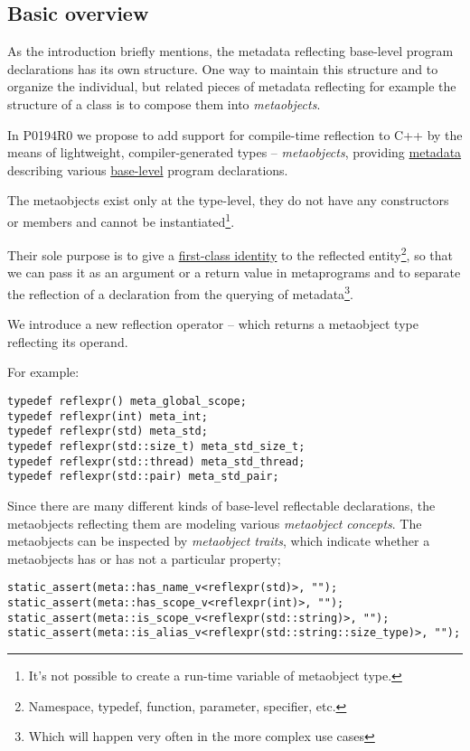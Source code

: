 \subsection{Basic overview}

As the introduction briefly mentions, the metadata reflecting base-level
program declarations has its own structure. One way to maintain this structure
and to organize the individual, but related pieces of metadata reflecting
for example the structure of a class is to compose them into {\em metaobjects}.

In P0194R0 we propose to add support for
compile-time reflection to C++ by the means of lightweight, compiler-generated
types -- {\em metaobjects}, providing \hyperref[term-metadata]{metadata}
describing various \hyperref[term-base-meta-level]{base-level} program declarations.

The metaobjects exist only at the type-level, they do not have any constructors
or members and cannot be instantiated\footnote{It's not possible to create
a run-time variable of metaobject type.}.

Their sole purpose is to give a \hyperref[term-first-class]{first-class identity}
to the reflected entity\footnote{Namespace, typedef, function, parameter, specifier, etc.},
so that we can pass it as an argument or a return value in metaprograms and to
separate the reflection of a declaration from the querying of metadata\footnote
{Which will happen very often in the more complex use cases}.

We introduce a new reflection operator -- \verb@reflexpr@ which returns a
metaobject type reflecting its operand.

For example:

\begin{verbatim}
typedef reflexpr() meta_global_scope;
typedef reflexpr(int) meta_int;
typedef reflexpr(std) meta_std;
typedef reflexpr(std::size_t) meta_std_size_t;
typedef reflexpr(std::thread) meta_std_thread;
typedef reflexpr(std::pair) meta_std_pair;
\end{verbatim}

Since there are many different kinds of
base-level reflectable declarations, the metaobjects reflecting them are
modeling various {\em metaobject concepts}. The metaobjects can be inspected
by {\em metaobject traits}, which indicate whether a metaobjects has or has
not a particular property;

\begin{verbatim}
static_assert(meta::has_name_v<reflexpr(std)>, "");
static_assert(meta::has_scope_v<reflexpr(int)>, "");
static_assert(meta::is_scope_v<reflexpr(std::string)>, "");
static_assert(meta::is_alias_v<reflexpr(std::string::size_type)>, "");
\end{verbatim}

